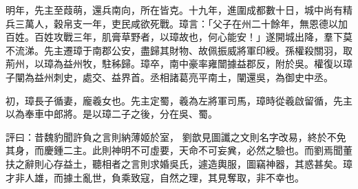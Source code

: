 \begin{pinyinscope}
 
明年，先主至葭萌，還兵南向，所在皆克。十九年，進圍成都數十日，城中尚有精兵三萬人，穀帛支一年，吏民咸欲死戰。璋言：「父子在州二十餘年，無恩德以加百姓。百姓攻戰三年，肌膏草野者，以璋故也，何心能安！」遂開城出降，羣下莫不流涕。先主遷璋于南郡公安，盡歸其財物、故佩振威將軍印綬。孫權殺關羽，取荊州，以璋為益州牧，駐秭歸。璋卒，南中豪率雍闓據益郡反，附於吳。權復以璋子闡為益州刺史，處交、益界首。丞相諸葛亮平南土，闡還吳，為御史中丞。
 
 
 
 
 初，璋長子循妻，龐羲女也。先主定蜀，羲為左將軍司馬，璋時從羲啟留循，先主以為奉車中郎將。是以璋二子之後，分在吳、蜀。
 
 
評曰：昔魏豹聞許負之言則納薄姬於室，
 劉歆見圖讖之文則名字改易，終於不免其身，而慶鍾二主。此則神明不可虛要，天命不可妄兾，必然之驗也。而劉焉聞董扶之辭則心存益土，聽相者之言則求婚吳氏，遽造輿服，圖竊神器，其惑甚矣。璋才非人雄，而據土亂世，負乘致寇，自然之理，其見奪取，非不幸也。
 
 
\end{pinyinscope}